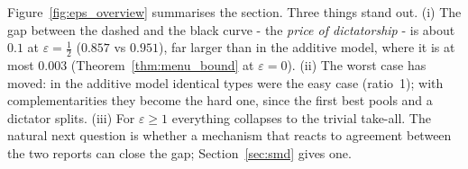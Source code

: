 Figure~\ref{fig:eps_overview} summarises the section. Three things stand out. (i) The gap between
the dashed and the black curve - the \emph{price of dictatorship} - is about $0.1$ at
$\varepsilon=\tfrac12$ ($0.857$ vs $0.951$), far larger than in the additive model, where it is at most
$0.003$ (Theorem~\ref{thm:menu_bound} at $\varepsilon=0$). (ii) The worst case has moved: in the additive model identical types were the
easy case (ratio~1); with complementarities they become the hard one, since the first best pools
and a dictator splits. (iii) For $\varepsilon\ge1$ everything collapses to the trivial take-all. The
natural next question is whether a mechanism that reacts to agreement between the two reports
can close the gap; Section~\ref{sec:smd} gives one.
